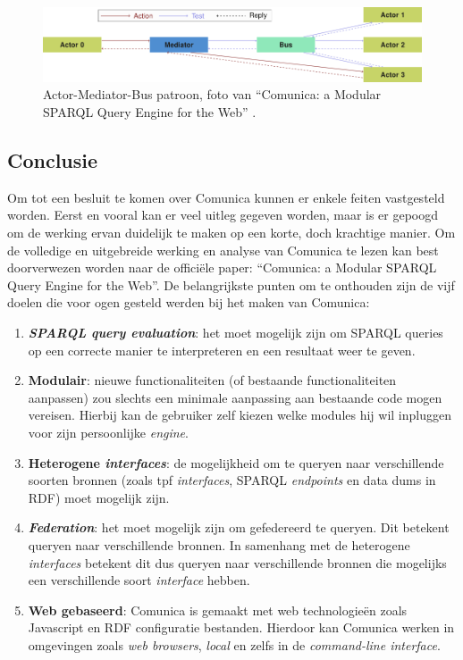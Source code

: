 \begin{figure}
    \centering
    \includegraphics[width=\linewidth]{images/comunica-actor-mediator-bus.png}
    \caption{Actor-Mediator-Bus patroon, foto van ``Comunica: a Modular SPARQL Query Engine for the Web'' \cite{taelman2018comunica}.}
    \label{fig:actor-mediator-bus}
\end{figure}



\subsection{Conclusie}
Om tot een besluit te komen over Comunica kunnen er enkele feiten vastgesteld worden. Eerst en vooral kan er veel uitleg gegeven worden, maar is er gepoogd om de werking ervan duidelijk te maken op een korte, doch krachtige manier. Om de volledige en uitgebreide werking en analyse van Comunica te lezen kan best doorverwezen worden naar de officiële paper: ``Comunica: a Modular SPARQL Query Engine for the Web''. De belangrijkste punten om te onthouden zijn de vijf doelen die voor ogen gesteld werden bij het maken van Comunica:
\begin{enumerate}
    \item \textbf{\textit{SPARQL query evaluation}}: het moet mogelijk zijn om SPARQL queries op een correcte manier te interpreteren en een resultaat weer te geven.
    \item \textbf{Modulair}: nieuwe functionaliteiten (of bestaande functionaliteiten aanpassen) zou slechts een minimale aanpassing aan bestaande code mogen vereisen. Hierbij kan de gebruiker zelf kiezen welke modules hij wil inpluggen voor zijn persoonlijke \textit{engine}.
    \item \textbf{Heterogene \textit{interfaces}}: de mogelijkheid om te queryen naar verschillende soorten bronnen (zoals \acrshort{tpf} \textit{interfaces}, SPARQL \textit{endpoints} en data dums in RDF) moet mogelijk zijn.
    \item \textbf{\textit{Federation}}: het moet mogelijk zijn om gefedereerd te queryen. Dit betekent queryen naar verschillende bronnen. In samenhang met de heterogene \textit{interfaces} betekent dit dus queryen naar verschillende bronnen die mogelijks een verschillende soort \textit{interface} hebben.
    \item \textbf{Web gebaseerd}: Comunica is gemaakt met web technologieën zoals Javascript en RDF configuratie bestanden. Hierdoor kan Comunica werken in omgevingen zoals \textit{web browsers}, \textit{local} en zelfs in de \textit{command-line interface}.
\end{enumerate}